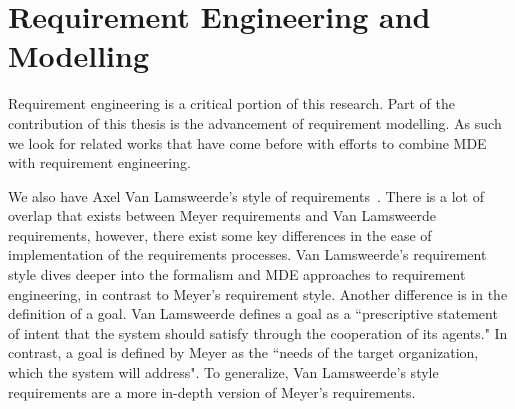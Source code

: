 \section{Requirement Engineering and Modelling}

Requirement engineering is a critical portion of this research. Part of the contribution of this thesis is the advancement of requirement modelling. As such we look for related works that have come before with efforts to combine \ac{MDE} with requirement engineering.

We also have Axel Van Lamsweerde's style of requirements~\cite{lamsweerde2009requirements}. There is a lot of overlap that exists between Meyer requirements and Van Lamsweerde requirements, however, there exist some key differences in the ease of implementation of the requirements processes. Van Lamsweerde's requirement style dives deeper into the formalism and MDE approaches to requirement engineering, in contrast to Meyer's requirement style. Another difference is in the definition of a goal. Van Lamsweerde defines a goal as a ``prescriptive statement of intent that the system should satisfy through the cooperation of its agents." In contrast, a goal is defined by Meyer as the ``needs of the target organization, which the system will address". To generalize, Van Lamsweerde's style requirements are a more in-depth version of Meyer's requirements. 

